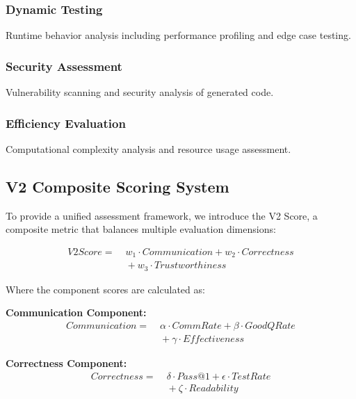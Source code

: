 \documentclass[conference]{IEEEtran}
\begin{document}
\subsubsection{Dynamic Testing}

Runtime behavior analysis including performance profiling and edge case testing.

\subsubsection{Security Assessment}

Vulnerability scanning and security analysis of generated code.

\subsubsection{Efficiency Evaluation}

Computational complexity analysis and resource usage assessment.

\subsection{V2 Composite Scoring System}

To provide a unified assessment framework, we introduce the V2 Score, a composite metric that balances multiple evaluation dimensions:

\begin{align}
    \mathit{V2Score} =
    &\; w_1 \cdot \mathit{Communication}
    + w_2 \cdot \mathit{Correctness} \\
    &\; + w_3 \cdot \mathit{Trustworthiness}
\end{align}

Where the component scores are calculated as:

\textbf{Communication Component:}
\begin{align}
    \mathit{Communication} =
    &\; \alpha \cdot \mathit{CommRate}
    + \beta \cdot \mathit{GoodQRate} \\
    &\; + \gamma \cdot \mathit{Effectiveness}
\end{align}

\textbf{Correctness Component:}
\begin{align}
    \mathit{Correctness} =
    &\; \delta \cdot \mathit{Pass@1}
    + \epsilon \cdot \mathit{TestRate} \\
    &\; + \zeta \cdot \mathit{Readability}
\end{align}
\end{document}
